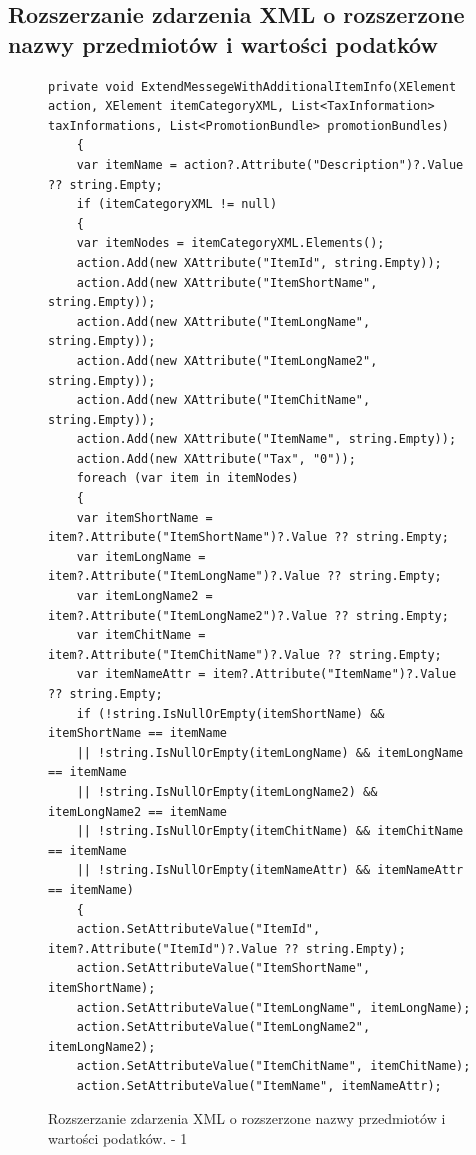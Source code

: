 \documentclass[a4paper]{book}
\begin{document}
\subsection{Rozszerzanie zdarzenia XML o rozszerzone nazwy przedmiotów i wartości podatków}
\begin{figure}[h]
	\begin{lstlisting}[frame=single, breaklines=true]
	private void ExtendMessegeWithAdditionalItemInfo(XElement action, XElement itemCategoryXML, List<TaxInformation> taxInformations, List<PromotionBundle> promotionBundles)
	{
	var itemName = action?.Attribute("Description")?.Value ?? string.Empty;
	if (itemCategoryXML != null)
	{
	var itemNodes = itemCategoryXML.Elements();
	action.Add(new XAttribute("ItemId", string.Empty));
	action.Add(new XAttribute("ItemShortName", string.Empty));
	action.Add(new XAttribute("ItemLongName", string.Empty));
	action.Add(new XAttribute("ItemLongName2", string.Empty));
	action.Add(new XAttribute("ItemChitName", string.Empty));
	action.Add(new XAttribute("ItemName", string.Empty));
	action.Add(new XAttribute("Tax", "0"));
	foreach (var item in itemNodes)
	{
	var itemShortName = item?.Attribute("ItemShortName")?.Value ?? string.Empty;
	var itemLongName = item?.Attribute("ItemLongName")?.Value ?? string.Empty;
	var itemLongName2 = item?.Attribute("ItemLongName2")?.Value ?? string.Empty;
	var itemChitName = item?.Attribute("ItemChitName")?.Value ?? string.Empty;
	var itemNameAttr = item?.Attribute("ItemName")?.Value ?? string.Empty;	
	if (!string.IsNullOrEmpty(itemShortName) && itemShortName == itemName
	|| !string.IsNullOrEmpty(itemLongName) && itemLongName == itemName
	|| !string.IsNullOrEmpty(itemLongName2) && itemLongName2 == itemName
	|| !string.IsNullOrEmpty(itemChitName) && itemChitName == itemName
	|| !string.IsNullOrEmpty(itemNameAttr) && itemNameAttr == itemName)
	{
	action.SetAttributeValue("ItemId", item?.Attribute("ItemId")?.Value ?? string.Empty);
	action.SetAttributeValue("ItemShortName", itemShortName);
	action.SetAttributeValue("ItemLongName", itemLongName);
	action.SetAttributeValue("ItemLongName2", itemLongName2);
	action.SetAttributeValue("ItemChitName", itemChitName);
	action.SetAttributeValue("ItemName", itemNameAttr);
	\end{lstlisting}
	\caption{Rozszerzanie zdarzenia XML o rozszerzone nazwy przedmiotów i wartości podatków. - 1}
	\label{lst:rozszerzanieXML1}
\end{figure}
\end{document}
